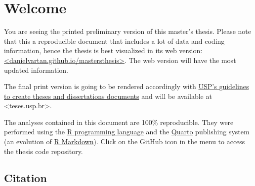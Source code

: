 \documentclass[
  12pt,
  a4paper,
  oneside]{tesesusp}
\renewcommand*\contentsname{Table of contents}
\newcommand\contentsname{Table of contents}
\begin{document}
\renewcommand*\contentsname{Table of contents}
{
\hypersetup{linkcolor=}
\setcounter{tocdepth}{2}
\tableofcontents
}

\hypertarget{welcome}{%
\chapter*{Welcome}\label{welcome}}


\begin{tcolorbox}[enhanced jigsaw, breakable, colback=white, colbacktitle=quarto-callout-important-color!10!white, leftrule=.75mm, left=2mm, toprule=.15mm, opacityback=0, rightrule=.15mm, title=\textcolor{quarto-callout-important-color}{\faExclamation}\hspace{0.5em}{Important}, opacitybacktitle=0.6, bottomtitle=1mm, titlerule=0mm, toptitle=1mm, coltitle=black, colframe=quarto-callout-important-color-frame, bottomrule=.15mm, arc=.35mm]

You are seeing the printed preliminary version of this master's thesis.
Please note that this a reproducible document that includes a lot of
data and coding information, hence the thesis is best visualized in its
web version:
\href{https://danielvartan.github.io/mastersthesis}{\textless danielvartan.github.io/mastersthesis\textgreater{}}.
The web version will have the most updated information.

\vspace{5pt}

The final print version is going to be rendered accordingly with
\href{https://teses.usp.br/index.php?option=com_content\&view=article\&id=52\&Itemid=67\&lang=en}{USP's
guidelines to create theses and dissertations documents} and will be
available at
\href{https://teses.usp.br/}{\textless teses.usp.br\textgreater{}}.

\end{tcolorbox}

\vspace{15pt}

The analyses contained in this document are 100\% reproducible. They
were performed using the \href{https://www.r-project.org/}{R programming
language} and the \href{https://quarto.org/}{Quarto} publishing system
(an evolution of \href{https://rmarkdown.rstudio.com/}{R Markdown}).
Click on the GitHub icon in the menu to access the thesis code
repository.

\hypertarget{citation}{%
\section*{Citation}\label{citation}}
\end{document}
